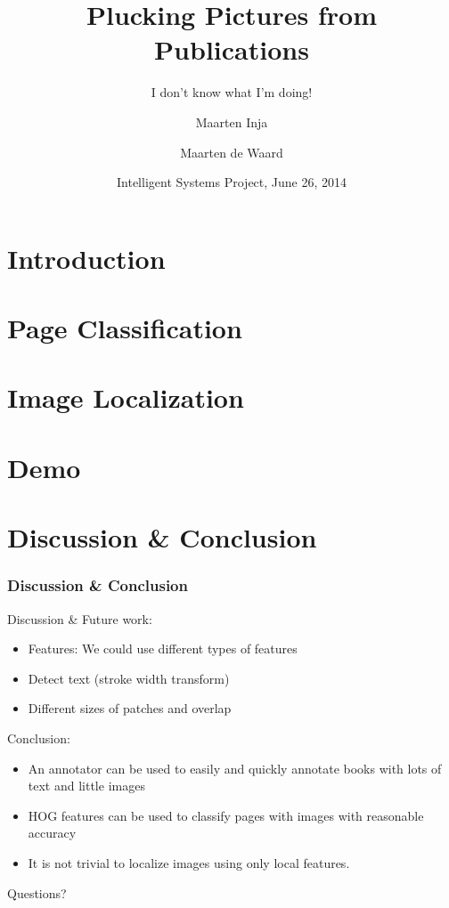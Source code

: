\documentclass{beamer}
\title{Plucking Pictures from Publications}
\subtitle{I don't know what I'm doing!}
\author{Maarten Inja \and Maarten de Waard}
\institute[UvA]{University of Amsterdam}
\date[2014]{Intelligent Systems Project, June 26, 2014}
\newcommand{\slide}[2]
{
\begin{frame}
\frametitle{#1} 

#2

\end{frame}
}
\begin{document}
\begin{frame}
\titlepage
\end{frame}

\section{Introduction}


\section{Page Classification}


\section{Image Localization}




\section{Demo}


\section{Discussion \& Conclusion} 

\slide{Discussion \& Conclusion}
{
	Discussion \& Future work:
	\begin{itemize}
		\item Features: We could use different types of features 
		\item Detect text (stroke width transform)
		\item Different sizes of patches and overlap
	\end{itemize}
	Conclusion:
	\begin{itemize}
		\item An annotator can be used to easily and quickly annotate books with
		lots of text and little images
		\item HOG features can be used to classify pages with images with
		reasonable accuracy
		\item It is not trivial to localize images using only local features.
	\end{itemize}
}
%         
%         

\begin{frame}
\begin{center}
Questions?
\end{center}
\end{frame}
\end{document}
